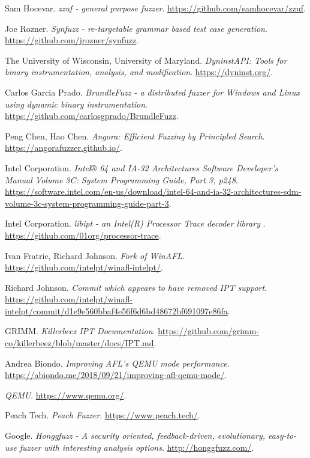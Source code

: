 \begin{thebibliography}{99}
  Sam Hocevar.
  \textit{zzuf - general purpose fuzzer}.
  \url{https://github.com/samhocevar/zzuf}.

  Joe Rozner.
  \textit{Synfuzz - re-targetable grammar based test case generation}.
  \url{https://github.com/jrozner/synfuzz}.

  The University of Wisconsin, University of Maryland.
  \textit{DyninstAPI: Tools for binary instrumentation, analysis, and modification}.
  \url{https://dyninst.org/}.

  Carlos Garcia Prado.
  \textit{BrundleFuzz - a distributed fuzzer for Windows and Linux using dynamic binary instrumentation}.
  \url{https://github.com/carlosgprado/BrundleFuzz}.

  Peng Chen, Hao Chen.
  \textit{Angora: Efficient Fuzzing by Principled Search}.
  \url{https://angorafuzzer.github.io/}.

  Intel Corporation.
  \textit{Intel® 64 and IA-32 Architectures Software Developer's Manual Volume 3C: System Programming Guide, Part 3, p248}.
  \url{https://software.intel.com/en-us/download/intel-64-and-ia-32-architectures-sdm-volume-3c-system-programming-guide-part-3}.

  Intel Corporation.
  \textit{libipt - an Intel(R) Processor Trace decoder library }.
  \url{https://github.com/01org/processor-trace}.

  Ivan Fratric, Richard Johnson.
  \textit{Fork of WinAFL}.
  \url{https://github.com/intelpt/winafl-intelpt/}.

  Richard Johnson.
  \textit{Commit which appears to have removed IPT support}.
  \url{https://github.com/intelpt/winafl-intelpt/commit/d1e9e560bbaf4e56f6d6bd48672bf691097e86fa}.

  GRIMM.
  \textit{Killerbeez IPT Documentation}.
  \url{https://github.com/grimm-co/killerbeez/blob/master/docs/IPT.md}.

  Andrea Biondo.
  \textit{Improving AFL's QEMU mode performance}.
  \url{https://abiondo.me/2018/09/21/improving-afl-qemu-mode/}.

  \textit{QEMU}.
  \url{https://www.qemu.org/}.

  Peach Tech.
  \textit{Peach Fuzzer}.
  \url{https://www.peach.tech/}.

  Google.
  \textit{Honggfuzz - A security oriented, feedback-driven, evolutionary, easy-to-use fuzzer with interesting analysis options}.
  \url{http://honggfuzz.com/}.


\end{thebibliography}
